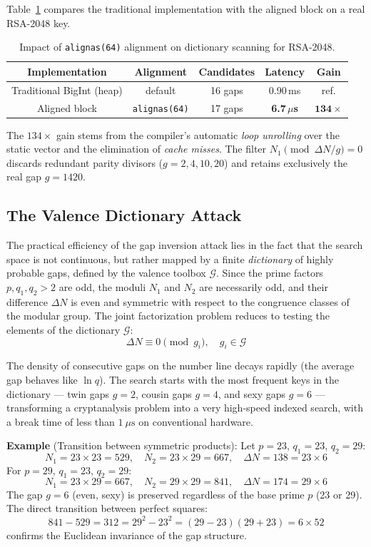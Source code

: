\documentclass[12pt,a4paper]{article}
\theoremstyle{plain}
\begin{document}
Table~\ref{tab:alinhamento_l1} compares the traditional
implementation with the aligned block on a real RSA-2048 key.

\begin{table}[htbp]
\centering
\caption{Impact of \texttt{alignas(64)} alignment on dictionary scanning
for RSA-2048.}
\label{tab:alinhamento_l1}
\begin{tabular}{ccccc}
\hline
Implementation & Alignment & Candidates & Latency & Gain \\
\hline
Traditional BigInt (heap) & default & 16 gaps & 0.90\,ms & ref. \\
Aligned block & \texttt{alignas(64)} & 17 gaps & \textbf{6.7\,$\mu$s} & $\mathbf{134\times}$ \\
\hline
\end{tabular}
\end{table}

The $134\times$ gain stems from the compiler's automatic \textit{loop
unrolling} over the static vector and the elimination of \textit{cache
misses}. The filter $N_1 \pmod{\Delta N / g} = 0$ discards redundant
parity divisors ($g=2,4,10,20$) and retains exclusively the real gap
$g=1420$.

\subsection{The Valence Dictionary Attack}

The practical efficiency of the gap inversion attack lies in the fact
that the search space is not continuous, but rather mapped by a finite
\textit{dictionary} of highly probable gaps, defined by the valence
toolbox $\mathcal{G}$. Since the prime factors $p, q_1, q_2 > 2$ are
odd, the moduli $N_1$ and $N_2$ are necessarily odd, and their difference
$\Delta N$ is even and symmetric with respect to the congruence classes
of the modular group. The joint factorization problem reduces to testing
the elements of the dictionary $\mathcal{G}$:
\[
\Delta N \equiv 0 \pmod{g_i}, \quad g_i \in \mathcal{G}
\]

The density of consecutive gaps on the number line decays rapidly (the
average gap behaves like $\ln q$). The search starts with the most
frequent keys in the dictionary --- twin gaps $g=2$, cousin gaps $g=4$,
and sexy gaps $g=6$ --- transforming a cryptanalysis problem into a very
high-speed indexed search, with a break time of less than $1~\mu\text{s}$
on conventional hardware.

\noindent\textbf{Example} (Transition between symmetric products):
Let $p = 23$, $q_1 = 23$, $q_2 = 29$:
\[
N_1 = 23 \times 23 = 529,\quad
N_2 = 23 \times 29 = 667,\quad
\Delta N = 138 = 23 \times 6
\]
For $p = 29$, $q_1 = 23$, $q_2 = 29$:
\[
N_1 = 23 \times 29 = 667,\quad
N_2 = 29 \times 29 = 841,\quad
\Delta N = 174 = 29 \times 6
\]
The gap $g = 6$ (even, sexy) is preserved regardless of the base prime
$p$ (23 or 29). The direct transition between perfect squares:
\[
841 - 529 = 312 = 29^2 - 23^2 = (29-23)(29+23) = 6 \times 52
\]
confirms the Euclidean invariance of the gap structure.
\end{document}
